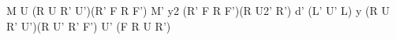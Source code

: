 M U (R U R' U')(R' F R F') M'
y2 (R' F R F')(R U2' R') d' (L' U' L)
y (R U R' U')(R U' R' F') U' (F R U R')
